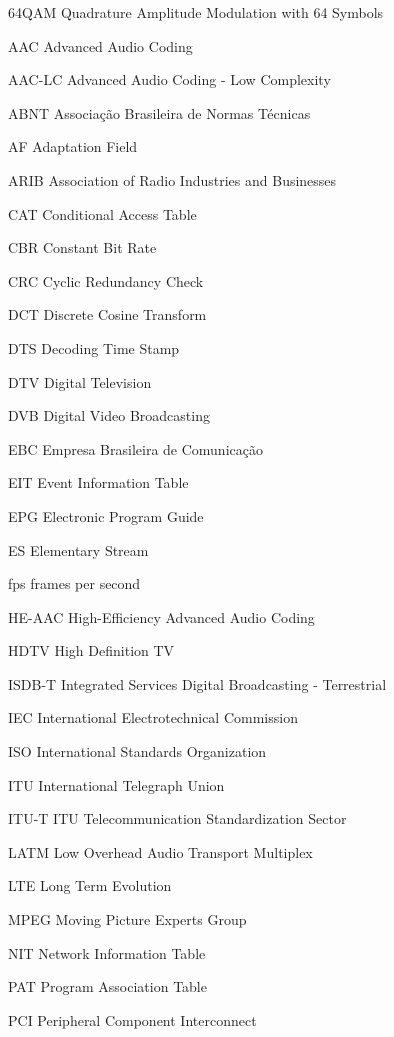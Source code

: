\begin{siglas}
  \item[64QAM] Quadrature Amplitude Modulation with 64 Symbols
  \item[AAC] Advanced Audio Coding
  \item[AAC-LC] Advanced Audio Coding - Low Complexity
  \item[ABNT] Associação Brasileira de Normas Técnicas
  \item[AF] Adaptation Field
  \item[ARIB] Association of Radio Industries and Businesses
  \item[CAT] Conditional Access Table
  \item[CBR] Constant Bit Rate
  \item[CRC] Cyclic Redundancy Check
  \item[DCT] Discrete Cosine Transform
  \item[DTS] Decoding Time Stamp
  \item[DTV] Digital Television
  \item[DVB] Digital Video Broadcasting
  \item[EBC] Empresa Brasileira de Comunicação
  \item[EIT] Event Information Table
  \item[EPG] Electronic Program Guide
  \item[ES] Elementary Stream
  \item[fps] frames per second
  \item[HE-AAC] High-Efficiency Advanced Audio Coding
  \item[HDTV] High Definition TV
  \item[ISDB-T] Integrated Services Digital Broadcasting - Terrestrial
  \item[IEC] International Electrotechnical Commission
  \item[ISO] International Standards Organization
  \item[ITU] International Telegraph Union
  \item[ITU-T] ITU Telecommunication Standardization Sector
  \item[LATM] Low Overhead Audio Transport Multiplex
  \item[LTE] Long Term Evolution
  \item[MPEG] Moving Picture Experts Group
  \item[NIT] Network Information Table
  \item[PAT] Program Association Table
  \item[PCI] Peripheral Component Interconnect

\end{siglas}
